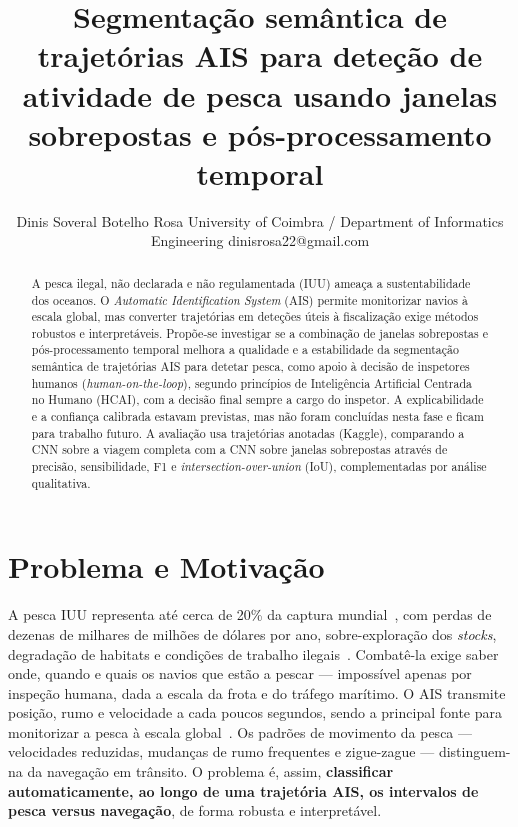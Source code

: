 \documentclass{article}
\title{Segmenta\c{c}\~ao sem\^antica de trajet\'orias AIS para dete\c{c}\~ao de atividade de pesca usando janelas sobrepostas e p\'os-processamento temporal}
\author{
    Dinis Soveral Botelho Rosa
    \affiliations
    University of Coimbra / Department of Informatics Engineering
    \emails
    dinisrosa22@gmail.com
}
\newcommand{\revtext}[2]{{\color{#1}#2}}
\newcommand{\rv}[1]{#1}
\begin{document}
\maketitle

\begin{abstract}
A pesca ilegal, não declarada e não regulamentada (IUU) ameaça a sustentabilidade dos oceanos. O \emph{Automatic Identification System} (AIS) permite monitorizar navios à escala global, mas converter trajetórias em deteções úteis à fiscalização exige métodos robustos e interpretáveis. Propõe-se investigar se a combinação de janelas sobrepostas e pós-processamento temporal melhora a qualidade e a estabilidade da segmentação semântica de trajetórias AIS para detetar pesca, como apoio à decisão de inspetores humanos (\revtext{rev062}{\emph{human-on-the-loop}}), segundo princípios de Inteligência Artificial Centrada no Humano (HCAI)\revtext{rev062}{, com a decisão final sempre a cargo do inspetor. A explicabilidade e a confiança calibrada estavam previstas, mas não foram concluídas nesta fase e ficam para trabalho futuro}. A avaliação usa \rv{\resDadosViagens} trajetórias anotadas (Kaggle), \revtext{rev042}{comparando a CNN sobre a viagem completa com a CNN sobre janelas sobrepostas} através de precisão, sensibilidade, F1 e \emph{intersection-over-union} (IoU), complementadas por análise qualitativa.
\end{abstract}

\section{Problema e Motivação}
\label{sec:problema-motivacao}

A pesca IUU representa até cerca de 20\% da captura mundial~\cite{agnew2009}, com perdas de dezenas de milhares de milhões de dólares por ano, sobre-exploração dos \emph{stocks}, degradação de habitats e condições de trabalho ilegais~\cite{chuaysi2020}. Combatê-la exige saber onde, quando e quais os navios que estão a pescar --- impossível apenas por inspeção humana, dada a escala da frota e do tráfego marítimo. O AIS transmite posição, rumo e velocidade a cada poucos segundos, sendo a principal fonte para monitorizar a pesca à escala global~\cite{natale2015,kroodsma2018}. Os padrões de movimento da pesca --- velocidades reduzidas, mudanças de rumo frequentes e zigue-zague --- distinguem-na da navegação em trânsito. O problema é, assim, \textbf{classificar automaticamente, ao longo de uma trajetória AIS, os intervalos de pesca versus navegação}, de forma robusta e interpretável.
\end{document}
